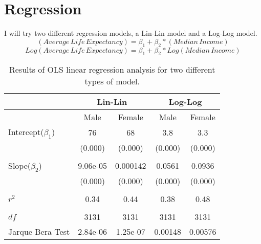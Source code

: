 \documentclass[12pt]{article}
\begin{document}
\section*{Regression}
I will try two different regression models, a Lin-Lin model and a Log-Log model.
\begin{equation*}
      (Average\,Life\,Expectancy) = \beta_1 + \beta_2*(Median\,Income)
\end{equation*}
\begin{equation*}
      Log(Average\,Life\,Expectancy) = \beta_1 + \beta_2*Log(Median\,Income)
\end{equation*}
\begin{table}[h]
          \centering
            \begin{tabular}{lcccc}            
              \multicolumn{1}{l}{} &\multicolumn{2}{c}{Lin-Lin}       & \multicolumn{2}{c}{Log-Log} \\\hline\hline
                                    & Male                      & Female          & Male      & Female \\
              \hline
              Intercept($\beta_1$) & 76    & 68    & 3.8 & 3.3\\
                                   & (0.000) & (0.000)   & (0.000) & (0.000)\\
                                   &                                  &                           &                                     &\\
              Slope($\beta_2$)     & 9.06e-05  & 0.000142    & 0.0561 & 0.0936\\
                                   & (0.000) & (0.000) & (0.000) & (0.000)\\
                                   &                                  &                               &                                     & \\
              $r^2$                & 0.34 & 0.44 & 0.38 & 0.48\\
                                   &                                  &                               &                                     & \\
              $df$                 & 3131   & 3131      & 3131 & 3131\\
              Jarque Bera Test     & 2.84e-06    & 1.25e-07     & 0.00148 & 0.00576\\
              \hline
            \end{tabular}
        \centering
        \caption{Results of OLS linear regression analysis for two different types of model.}
        \label{regressiontable}
\end{table}
\end{document}
